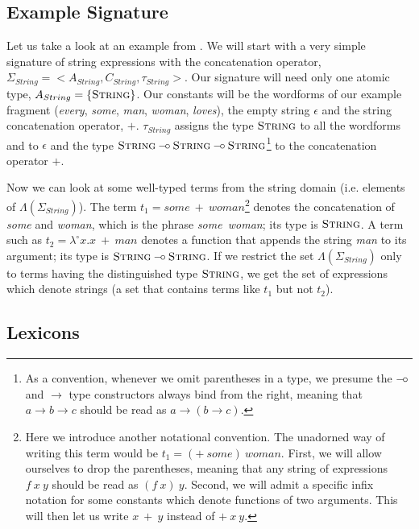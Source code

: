 \subsection{Example Signature}
\label{ssec:example-sig}

Let us take a look at an example from
\cite{pogodalla2007generalizing}. We will start with a very simple
signature of string expressions with the concatenation operator,
$\Sigma_{String} = \mathopen{<}A_{String}, C_{String},
\tau_{String}\mathclose{>}$. Our signature will need only one atomic
type, $A_{String} = \{\textsc{String}\}$. Our constants will be the
wordforms of our example fragment (\emph{every}, \emph{some},
\emph{man}, \emph{woman}, \emph{loves}), the empty string $\epsilon$ and
the string concatenation operator, $+$. $\tau_{String}$ assigns the type
$\textsc{String}$ to all the wordforms and to $\epsilon$ and the type
$\textsc{String} \mathbin{{-}\mkern-3.5mu{\circ}} \textsc{String} \mathbin{{-}\mkern-3.5mu{\circ}}
\textsc{String}$\footnote{As a convention, whenever we omit parentheses
  in a type, we presume the $\mathbin{{-}\mkern-3.5mu{\circ}}$ and $\to$ type constructors always
  bind from the right, meaning that $a \to b \to c$ should be read as $a
  \to (b \to c)$.}  to the concatenation operator $+$.

Now we can look at some well-typed terms from the string domain
(i.e. elements of $\Lambda(\Sigma_{String})$). The term $t_1 =
some\ +\ woman$\footnote{Here we introduce another notational
  convention. The unadorned way of writing this term would be $t_1 =
  (+\ some)\ woman$. First, we will allow ourselves to drop the
  parentheses, meaning that any string of expressions $f\ x\ y$ should
  be read as $(f\ x)\ y$. Second, we will admit a specific infix
  notation for some constants which denote functions of two
  arguments. This will then let us write $x\ +\ y$ instead of
  $+\ x\ y$.} denotes the concatenation of \emph{some} and \emph{woman},
which is the phrase \emph{some\ woman}; its type is $\textsc{String}$. A
term such as $t_2 = \lambda^{\circ} x. x\ +\ man$ denotes a function
that appends the string \emph{man} to its argument; its type is
$\textsc{String} \mathbin{{-}\mkern-3.5mu{\circ}} \textsc{String}$. If we restrict the set
$\Lambda(\Sigma_{String})$ only to terms having the distinguished type
$\textsc{String}$, we get the set of expressions which denote strings (a
set that contains terms like $t_1$ but not $t_2$).

\subsection{Lexicons}

